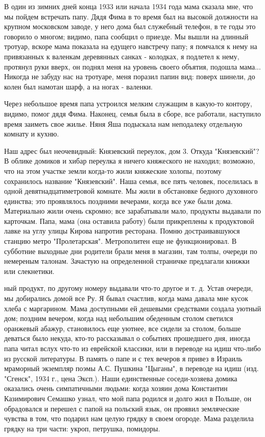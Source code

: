 \label{153-1}
В один из зимних дней конца 1933 или начала 1934 года мама сказала мне, что мы пойдем встречать папу. Дядя Фима в то время был на высокой должности на крупном московском заводе, у него дома был служебный телефон, в те годы это говорило о многом; видимо, папа сообщил о приезде. Мы вышли на длинный тротуар, вскоре мама показала на едущего навстречу папу; я помчался к нему на привязанных к валенкам деревянных санках - колодках, я подлетел к нему, протянул руки вверх, он поднял меня на уровень своего объятия, подошла мама... Никогда не забуду нас на тротуаре, меня поразил папин вид: поверх шинели, до колен был намотан шарф, а на ногах - валенки.

Через небольшое время папа устроился мелким служащим в какую-то контору, видимо, помог дядя Фима. Наконец, семья была в сборе, все работали, наступило время заиметь свое жилье. Няня Яша подыскала нам неподалеку отдельную комнату и кухню.

\label{154-1}
Наш адрес был неочевидный: Князевский переулок, дом 3. Откуда "Князевский"? В облике домиков и хибар переулка я ничего княжеского не находил; возможно, что на этом участке земли когда-то жили княжеские холопы, поэтому сохранилось название "Князевский". Наша семья, все пять человек, поселилась в одной девятнадцатиметровой комнате. Мы жили в обстановке бедного духовного единства; это проявлялось поздними вечерами, когда все уже были дома. Материально жили очень скромно; все зарабатывали мало, продукты выдавали по карточкам. Папа, мама (она оставила работу) были прикреплены к продуктовой лавке на углу улицы Кирова напротив ресторана. Помню достраивавшуюся станцию метро "Пролетарская". Метрополитен еще не функционировал. В субботние выходные дни родители брали меня в магазин, там толпы, очереди по немереным талонам. Зачастую на определенной страничке предлагали книжки или слекнетики.

\label{155-1}
ный продукт, по другому номеру выдавали что-то другое и т. д. Устав очереди, мы добирались домой все Ру. Я бывал счастлив, когда мама давала мне кусок хлеба с маргарином. Мама доступными ей дешевыми средствами создала уютный дом; поздним вечером, когда над небольшим обеденным столом светился оранжевый абажур, становилось еще уютнее, все сидели за столом, больше деваться было некуда, кто-то рассказывал о событиях прошедшего дня, иногда папа читал вслух что-то из еврейской классики, или в переводе на идиш что-либо из русской литературы. В память о папе и с тех вечеров я привез в Израиль мраморный экземпляр поэмы А.С. Пушкина "Цыганы", в переводе на идиш (изд. "Сгенск", 1934 г., цена Эксп.). Наши единственные соседи-хозяева домика оказались очень симпатичными людьми: когда хозяин дома Константин Казимирович Семашко узнал, что мой папа родился и долго жил в Польше, он обрадовался и перешел с папой на польский язык, он проявил земляческие чувства в том, что подарил нам целую грядку в своем огороде. Мама разделила грядку на три части: укроп, петрушка, помидоры.

